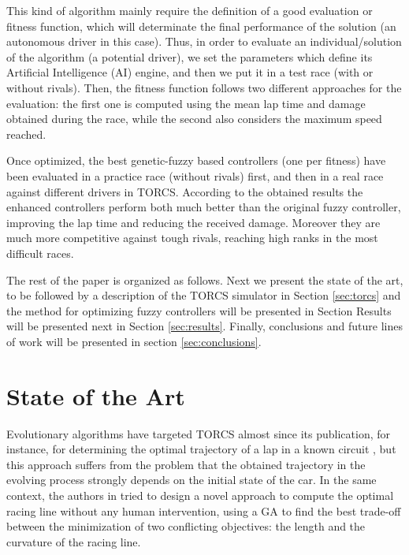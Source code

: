 \documentclass[conference]{IEEEtran}
\begin{document}
This kind of algorithm mainly require the definition of a good evaluation or fitness function, which will determinate the final performance of the solution (an autonomous driver in this case).
Thus, in order to evaluate an individual/solution of the algorithm (a potential driver), we set the parameters which define its Artificial Intelligence (AI) engine, and then we put it in a test race (with or without rivals).
Then, the fitness function follows two different approaches for the evaluation: the first one is computed using the mean lap time and damage obtained during the race, while the second also considers the maximum speed reached.

Once optimized, the best genetic-fuzzy based controllers (one per fitness) have been evaluated in a practice race (without rivals) first, and then in a real race against different drivers in TORCS. 
According to the obtained results the enhanced controllers perform both much better than the original fuzzy controller, improving the lap time and reducing the received damage. Moreover they are much more competitive against tough rivals, reaching high ranks in the most difficult races.


The rest of the paper is organized as follows. Next we present the
state of the art, to be followed by a description of the TORCS
simulator in Section \ref{sec:torcs} and the
method for optimizing fuzzy controllers will be presented in Section
Results will be presented next in Section \ref{sec:results}. Finally, conclusions and future lines of work will
be presented in section \ref{sec:conclusions}.


\section{State of the Art}
\label{sec:soa}

Evolutionary algorithms have targeted TORCS almost since its
publication, for instance, for determining the
optimal trajectory of a lap in a known circuit \cite{drivingGA2008},
but this approach suffers from the problem that the obtained
trajectory in the evolving process strongly depends on the initial
state of the car.  
In the same context, the authors in \cite{GaRaceLine2010} tried to design a novel approach to compute the optimal racing line without any human intervention, using a GA to find the best trade-off between
the minimization of two conflicting objectives: the length and
the curvature of the racing line.
\end{document}
